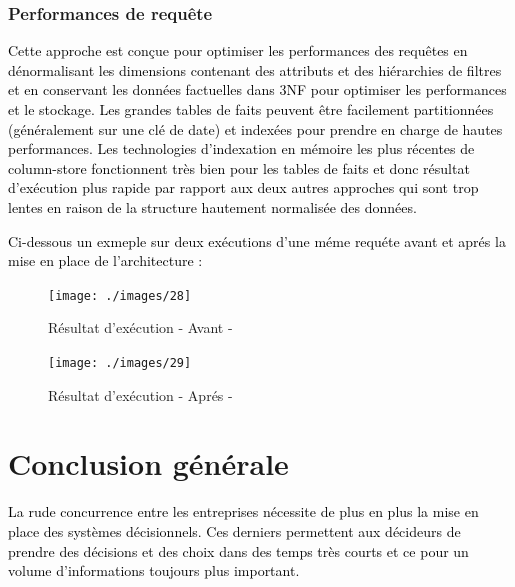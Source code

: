 \documentclass[a4paper,12pt]{report}
\begin{document}
\subsection{Performances de requête }
\textcolor{black}{Cette approche est conçue pour optimiser les performances des requêtes en dénormalisant les dimensions contenant des attributs et des hiérarchies de filtres et en conservant les données factuelles dans 3NF pour optimiser les performances et le stockage. Les grandes tables de faits peuvent être facilement partitionnées (généralement sur une clé de date) et indexées pour prendre en charge de hautes performances. Les technologies d'indexation en mémoire les plus récentes de column-store fonctionnent très bien pour les tables de faits et donc résultat d’exécution plus rapide par rapport aux deux autres approches qui sont trop lentes en raison de la structure hautement normalisée des données.}

\textcolor{black}{Ci-dessous un exmeple sur deux exécutions d'une méme requéte avant et aprés la mise en place de l'architecture :}



\begin{figure}[H]

\begin{center}
\texttt{[image: ./images/28]}
\end{center}

\caption{Résultat d'exécution - Avant -}
\label{fig:1}

\end{figure}


\begin{figure}[H]

\begin{center}
\texttt{[image: ./images/29]}
\end{center}

\caption{Résultat d'exécution  - Aprés -}
\label{fig:1}

\end{figure}






\newpage
\chapter*{Conclusion générale}


\textcolor{black}{La rude concurrence entre les entreprises nécessite de plus en plus la mise en place des systèmes décisionnels. Ces derniers permettent aux décideurs de prendre des décisions et des choix dans des temps très courts et ce pour un volume d’informations toujours plus important. }
\end{document}
